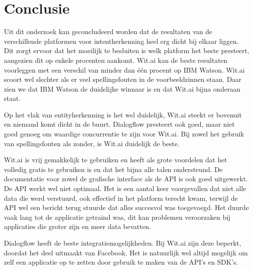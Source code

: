 
\chapter{Conclusie}
\label{ch:conclusie}


Uit dit onderzoek kan geconcludeerd worden dat de resultaten van de verschillende platformen voor intentherkenning heel erg dicht bij elkaar liggen. Dit zorgt ervoor dat het moeilijk te besluiten is welk platform het beste presteert, aangezien dit op enkele procenten aankomt. Wit.ai kan de beste resultaten voorleggen met een verschil van minder dan één procent op IBM Watson. Wit.ai scoort wel slechter als er veel spellingsfouten in de voorbeeldzinnen staan. Daar zien we dat IBM Watson de duidelijke winnaar is en dat Wit.ai bijna onderaan staat.

Op het vlak van entityherkenning is het wel duidelijk, Wit.ai steekt er bovenuit en niemand komt dicht in de buurt. Dialogflow presteert ook goed, maar niet goed genoeg om waardige concurrentie te zijn voor Wit.ai. Bij zowel het gebruik van spellingsfouten als zonder, is Wit.ai duidelijk de beste.

Wit.ai is vrij gemakkelijk te gebruiken en heeft als grote voordelen dat het volledig gratis te gebruiken is en dat het bijna alle talen ondersteund. De documentatie voor zowel de grafische interface als de API is ook goed uitgewerkt. De API werkt wel niet optimaal. Het is een aantal keer voorgevallen dat niet alle data die werd verstuurd, ook effectief in het platform terecht kwam, terwijl de API wel een bericht terug stuurde dat alles succesvol was toegevoegd. Het duurde vaak lang tot de applicatie getraind was, dit kan problemen veroorzaken bij applicaties die groter zijn en meer data bevatten.

Dialogflow heeft de beste integratiemogelijkheden. Bij Wit.ai zijn deze beperkt, doordat het deel uitmaakt van Facebook. Het is natuurlijk wel altijd mogelijk om zelf een applicatie op te zetten door gebruik te maken van de API’s en SDK’s.

